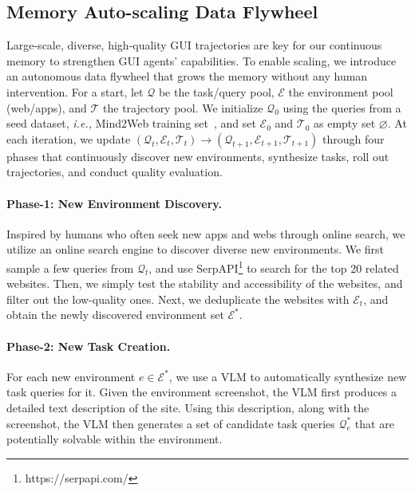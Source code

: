\documentclass{article} %
\newcommand{\ie}{\emph{i.e.,}\xspace}
\begin{document}
\subsection{Memory Auto-scaling Data Flywheel}
\label{sec:memory flywheel}
Large-scale, diverse, high-quality GUI trajectories are key for our continuous memory to strengthen GUI agents’ capabilities.
To enable scaling, we introduce an autonomous data flywheel that grows the memory without any human intervention.
For a start, let $\mathcal{Q}$ be the {task/query pool}, $\mathcal{E}$ the {environment pool} (web/apps), and $\mathcal{T}$ the {trajectory pool}. We initialize $\mathcal{Q}_0$ using the queries from a seed dataset, \ie Mind2Web training set~\citep{mind2web, zheng2024seeact_multimodal_mind2web}, and set $\mathcal{E}_0$ and $\mathcal{T}_0$ as empty set $\varnothing$.
At each iteration, we update $(\mathcal{Q}_t,\mathcal{E}_t,\mathcal{T}_t)\to(\mathcal{Q}_{t+1},\mathcal{E}_{t+1},\mathcal{T}_{t+1})$ through four phases that continuously discover new environments, synthesize tasks, roll out trajectories, and conduct quality evaluation.


\paragraph{Phase-1: New Environment Discovery.}
Inspired by humans who often seek new apps and webs through online search, we utilize an online search engine to discover diverse new environments. 
We first sample a few queries from $\mathcal{Q}_t$, and use SerpAPI\footnote{https://serpapi.com/} to search for the top 20 related websites. 
Then, we simply test the stability and accessibility of the websites, and filter out the low-quality ones.
Next, we deduplicate the websites with $\mathcal{E}_t$, and obtain the newly discovered environment set $\mathcal{E}^{*}$.



\paragraph{Phase-2: New Task Creation.}
For each new environment $e\in {\mathcal{E}}^{*}$, we use a VLM to automatically synthesize new task queries for it. Given the environment screenshot, the VLM first produces a detailed text description of the site. Using this description, along with the screenshot, the VLM then generates a set of candidate task queries $\mathcal{Q}^{*}_e$ that are potentially solvable within the environment. 
\end{document}
